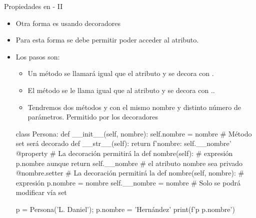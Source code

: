 \documentclass[10pt,envcountsect,spanish]{beamer}
\begin{document}
\begin{frame}[fragile]{Propiedades en  - II}

\begin{itemize}
\item Otra forma es usando decoradores 
\item Para esta forma se debe permitir poder acceder al atributo.
\item Los pasos son:

\begin{itemize}
\item Un método  se llamará igual que el atributo y se decora con .
\item El método  se le llama igual que al atributo y se decora con ..
\item Tendremos dos métodos  y  con el mismo nombre y distinto número de parámetros. Permitido por los decoradores
\end{itemize}


\footnotesize
\begin{pyconsole}[][frame=single]
class Persona:
    def __init__(self, nombre):
        self.nombre = nombre # Método set será decorado
    def __str__(self):
        return f'nombre: {self.__nombre}' 
    @property                  # La decoración permitirá la
    def nombre(self):          # expresión p.nombre aunque
        return self.__nombre   # el atributo nombre sea privado
    @nombre.setter             # La decoración permitirá la
    def nombre(self, nombre):  # expresión p.nombre = nombre
        self.__nombre = nombre # Solo se podrá modificar vía set

p = Persona('L. Daniel'); p.nombre = 'Hernández'
print(f'{p} {p.nombre}')
\end{pyconsole}

\end{itemize}
\end{frame}
\end{document}
